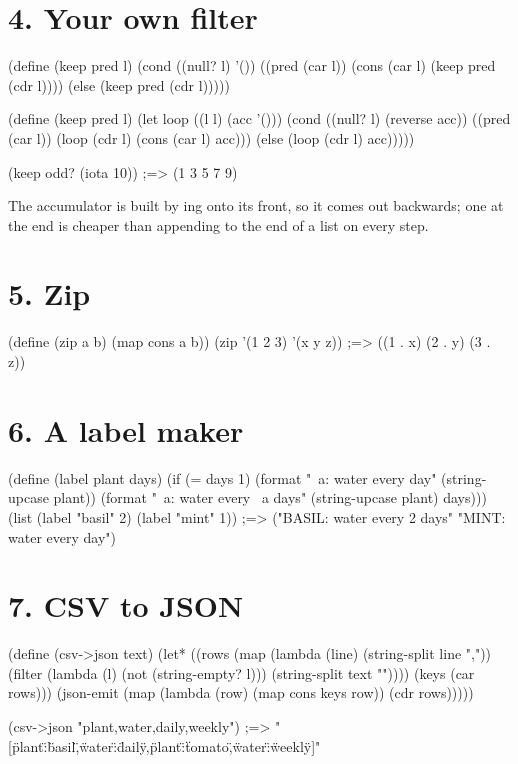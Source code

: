 \section*{4. Your own filter}

\begin{scm}
(define (keep pred l)
  (cond ((null? l) '())
        ((pred (car l)) (cons (car l) (keep pred (cdr l))))
        (else (keep pred (cdr l)))))

(define (keep pred l)
  (let loop ((l l) (acc '()))
    (cond ((null? l) (reverse acc))
          ((pred (car l)) (loop (cdr l) (cons (car l) acc)))
          (else (loop (cdr l) acc)))))

(keep odd? (iota 10))   ;=> (1 3 5 7 9)
\end{scm}

The accumulator is built by ing onto its front, so it comes out
backwards; one  at the end is cheaper than appending to the
end of a list on every step.

\section*{5. Zip}

\begin{scm}
(define (zip a b) (map cons a b))
(zip '(1 2 3) '(x y z))   ;=> ((1 . x) (2 . y) (3 . z))
\end{scm}

\section*{6. A label maker}

\begin{scm}
(define (label plant days)
  (if (= days 1)
      (format "~a: water every day" (string-upcase plant))
      (format "~a: water every ~a days" (string-upcase plant) days)))
(list (label "basil" 2) (label "mint" 1))
;=> ("BASIL: water every 2 days" "MINT: water every day")
\end{scm}

\section*{7. CSV to JSON}

\begin{scm}
(define (csv->json text)
  (let* ((rows (map (lambda (line) (string-split line ","))
                    (filter (lambda (l) (not (string-empty? l)))
                            (string-split text "\n"))))
         (keys (car rows)))
    (json-emit (map (lambda (row) (map cons keys row)) (cdr rows)))))

(csv->json "plant,water\nbasil,daily\ntomato,weekly")
;=> "[{\"plant\":\"basil\",\"water\":\"daily\"},{\"plant\":\"tomato\",\"water\":\"weekly\"}]"
\end{scm}

